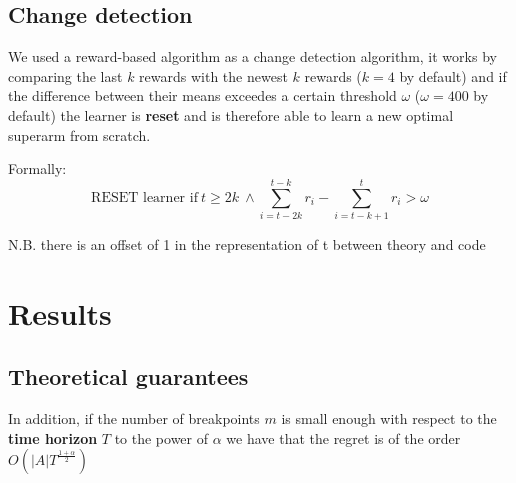 \subsection{Change detection}

We used a reward-based algorithm as a change detection algorithm, it works by comparing the last $k$ rewards with the newest $k$ rewards ($k=4$ by default) and if the difference between their means exceedes a certain threshold $\omega$ ($\omega=400$ by default) the learner is \textbf{reset} and is therefore able to learn a new optimal superarm from scratch.

Formally:
\begin{displaymath}
    \text{RESET learner if} ~ t \geq 2k ~ \land \sum_{i=t-2k}^{t-k} r_i -\sum_{i=t-k+1}^t r_i > \omega
\end{displaymath}

{\scriptsize N.B. there is an offset of 1 in the representation of t between theory and code}

\section{Results}


\subsection{Theoretical guarantees}

In addition, if the number of breakpoints $m$ is small enough with respect to the \textbf{time horizon} $T$ to the power of $\alpha$ we have that the regret is of the order $O\left( \vert A \vert T^{\frac{1+\alpha}{2}} \right)$
